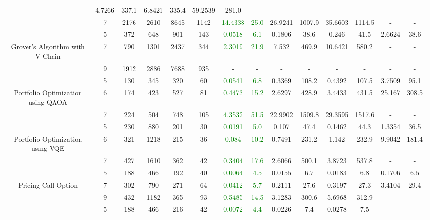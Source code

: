 \begin{table}[htb]
{\begin{tabular}{|c|c|c|c|c|c|c|c|c|c|c|c|c|c|}
 & 4.7266 & 337.1
 & 6.8421 & 335.4
 & 59.2539 & 281.0
 \\
 & 
7 & 2176 & 2610 & 8645 & 1142
 & \textcolor{green}{14.4338} & \textcolor{green}{25.0}
 & 26.9241 & 1007.9
 & 35.6603 & 1114.5
 & - & -
 \\
\hline
 & 
5 & 372 & 648 & 901 & 143
 & \textcolor{green}{0.0518} & \textcolor{green}{6.1}
 & 0.1806 & 38.6
 & 0.246 & 41.5
 & 2.6624 & 38.6
 \\
Grover's Algorithm with V-Chain & 
7 & 790 & 1301 & 2437 & 344
 & \textcolor{green}{2.3019} & \textcolor{green}{21.9}
 & 7.532 & 469.9
 & 10.6421 & 580.2
 & - & -
 \\
 & 
9 & 1912 & 2886 & 7688 & 935
 & - & -
 & - & -
 & - & -
 & - & -
 \\
\hline
 & 
5 & 130 & 345 & 320 & 60
 & \textcolor{green}{0.0541} & \textcolor{green}{6.8}
 & 0.3369 & 108.2
 & 0.4392 & 107.5
 & 3.7509 & 95.1
 \\
Portfolio Optimization using QAOA & 
6 & 174 & 423 & 527 & 81
 & \textcolor{green}{0.4473} & \textcolor{green}{15.2}
 & 2.6297 & 428.9
 & 3.4433 & 431.5
 & 25.167 & 308.5
 \\
 & 
7 & 224 & 504 & 748 & 105
 & \textcolor{green}{4.3532} & \textcolor{green}{51.5}
 & 22.9902 & 1509.8
 & 29.3595 & 1517.6
 & - & -
 \\
\hline
 & 
5 & 230 & 880 & 201 & 30
 & \textcolor{green}{0.0191} & \textcolor{green}{5.0}
 & 0.107 & 47.4
 & 0.1462 & 44.3
 & 1.3354 & 36.5
 \\
Portfolio Optimization using VQE & 
6 & 321 & 1218 & 215 & 36
 & \textcolor{green}{0.084} & \textcolor{green}{10.2}
 & 0.7491 & 231.2
 & 1.142 & 232.9
 & 9.9042 & 181.4
 \\
 & 
7 & 427 & 1610 & 362 & 42
 & \textcolor{green}{0.3404} & \textcolor{green}{17.6}
 & 2.6066 & 500.1
 & 3.8723 & 537.8
 & - & -
 \\
\hline
 & 
5 & 188 & 466 & 192 & 40
 & \textcolor{green}{0.0064} & \textcolor{green}{4.5}
 & 0.0155 & 6.7
 & 0.0183 & 6.8
 & 0.1706 & 6.5
 \\
Pricing Call Option & 
7 & 302 & 790 & 271 & 64
 & \textcolor{green}{0.0412} & \textcolor{green}{5.7}
 & 0.2111 & 27.6
 & 0.3197 & 27.3
 & 3.4104 & 29.4
 \\
 & 
9 & 432 & 1182 & 365 & 93
 & \textcolor{green}{0.5485} & \textcolor{green}{14.5}
 & 3.1283 & 300.6
 & 5.6968 & 312.9
 & - & -
 \\
\hline
 & 
5 & 188 & 466 & 216 & 42
 & \textcolor{green}{0.0072} & \textcolor{green}{4.4}
 & 0.0226 & 7.4
 & 0.0278 & 7.5

\end{tabular}}
\end{table}

